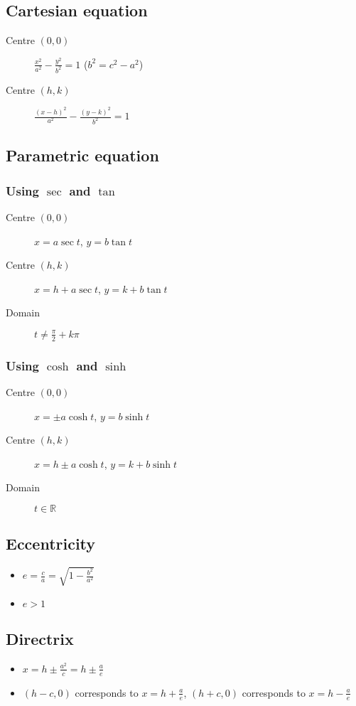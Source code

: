 \subsection{Cartesian equation}
\begin{description}
    \item[Centre $(0,0)$] $\frac{x^2}{a^2}-\frac{y^2}{b^2}=1$ ($b^2=c^2-a^2$)
    \item[Centre $(h,k)$] $\frac{(x-h)^2}{a^2}-\frac{(y-k)^2}{b^2}=1$
\end{description}
\subsection{Parametric equation}
\subsubsection{Using $\sec$ and $\tan$}
\begin{description}
    \item[Centre $(0,0)$] $x=a\sec t$, $y=b\tan t$
    \item[Centre $(h,k)$] $x=h+a\sec t$, $y=k+b\tan t$
    \item[Domain] $t\neq \frac{\pi}{2}+k\pi$
\end{description}
\subsubsection{Using $\cosh$ and $\sinh$}

\begin{description}
    \item[Centre $(0,0)$] $x=\pm a\cosh t$, $y=b\sinh t$
    \item[Centre $(h,k)$] $x=h\pm a\cosh t$, $y=k+b\sinh t$
    \item[Domain] $t \in \mathbb{R}$
\end{description}
\subsection{Eccentricity}
\begin{itemize}
    \item $e=\frac{c}{a}=\sqrt{1-\frac{b^2}{a^2}}$
    \item $e>1$
\end{itemize}
\subsection{Directrix}
\begin{itemize}
    \item $x=h\pm \frac{a^2}{c} = h\pm\frac{a}{e}$
    \item $(h-c, 0)$ corresponds to $x=h+\frac{a}{e}$, $(h+c, 0)$ corresponds to $x=h-\frac{a}{e}$
\end{itemize}
